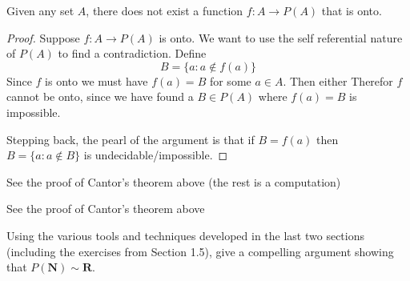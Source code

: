 \begin{solution}
\end{solution}


\begin{theorem}
  Given any set $A$, there does not exist a function $f: A \rightarrow P(A)$ that is onto.
\end{theorem}

\begin{proof}
  Suppose $f : A \to P(A)$ is onto. We want to use the self referential nature of $P(A)$ to find a contradiction. Define
  $$
  B = \{a : a \notin f(a)\}
  $$
  Since $f$ is onto we must have $f(a) = B$ for some $a \in A$. Then either
  Therefor $f$ cannot be onto, since we have found a $B \in P(A)$ where $f(a) = B$ is impossible.

  Stepping back, the pearl of the argument is that if $B = f(a)$ then $B = \{a : a \notin B\}$ is undecidable/impossible.
\end{proof}

\begin{exercise}
  See the proof of Cantor's theorem above (the rest is a computation)
\end{exercise}

\begin{exercise}
  See the proof of Cantor's theorem above
\end{exercise}

\begin{exercise}
  Using the various tools and techniques developed in the last two sections (including the exercises from Section 1.5), give a compelling argument showing that $P(\mathbf{N}) \sim \mathbf{R}$.
\end{exercise}


